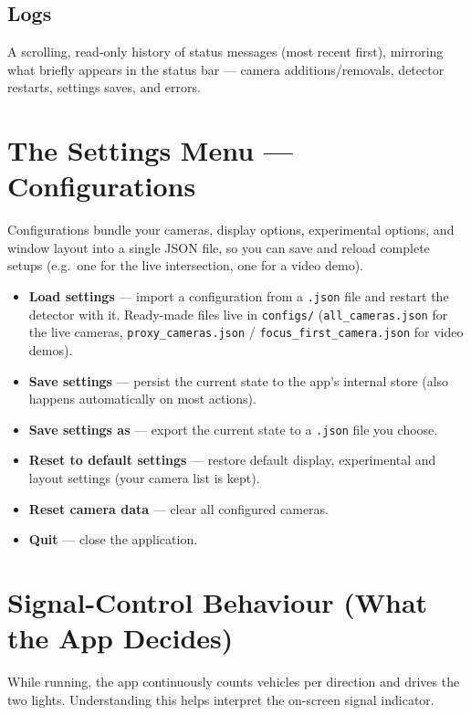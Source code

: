\documentclass[11pt]{article}
\newcommand{\code}[1]{\texttt{#1}}
\newcommand{\ui}[1]{\textbf{#1}}
\begin{document}
\subsection{Logs}
A scrolling, read-only history of status messages (most recent first), mirroring
what briefly appears in the status bar --- camera additions/removals, detector
restarts, settings saves, and errors.

\section{The Settings Menu --- Configurations}
Configurations bundle your cameras, display options, experimental options, and
window layout into a single JSON file, so you can save and reload complete
setups (e.g.\ one for the live intersection, one for a video demo).

\begin{itemize}[nosep]
  \item \ui{Load settings} --- import a configuration from a \code{.json} file
        and restart the detector with it. Ready-made files live in
        \code{configs/} (\code{all\_cameras.json} for the live cameras,
        \code{proxy\_cameras.json} / \code{focus\_first\_camera.json} for video
        demos).
  \item \ui{Save settings} --- persist the current state to the app's internal
        store (also happens automatically on most actions).
  \item \ui{Save settings as} --- export the current state to a \code{.json}
        file you choose.
  \item \ui{Reset to default settings} --- restore default display, experimental
        and layout settings (your camera list is kept).
  \item \ui{Reset camera data} --- clear all configured cameras.
  \item \ui{Quit} --- close the application.
\end{itemize}

\section{Signal-Control Behaviour (What the App Decides)}
While running, the app continuously counts vehicles per direction and drives the
two lights. Understanding this helps interpret the on-screen signal indicator.
\end{document}
